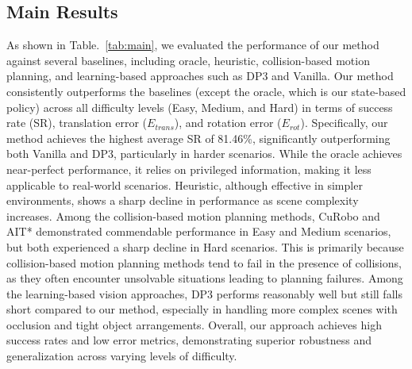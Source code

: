 \subsection{Main Results} 
As shown in Table.~\ref{tab:main}, we evaluated the performance of our method against several baselines, including oracle, heuristic, collision-based motion planning, and learning-based approaches such as DP3 and Vanilla. Our method consistently outperforms the baselines (except the oracle, which is our state-based policy) across all difficulty levels (Easy, Medium, and Hard) in terms of success rate (SR), translation error ($E_{trans}$), and rotation error ($E_{rot}$). Specifically, our method achieves the highest average SR of 81.46\%, significantly outperforming both Vanilla and DP3, particularly in harder scenarios. While the oracle achieves near-perfect performance, it relies on privileged information, making it less applicable to real-world scenarios. Heuristic, although effective in simpler environments, shows a sharp decline in performance as scene complexity increases. 
Among the collision-based motion planning methods, CuRobo and AIT* demonstrated commendable performance in Easy and Medium scenarios, but both experienced a sharp decline in Hard scenarios. This is primarily because collision-based motion planning methods tend to fail in the presence of collisions, as they often encounter unsolvable situations leading to planning failures. 
Among the learning-based vision approaches, DP3 performs reasonably well but still falls short compared to our method, especially in handling more complex scenes with occlusion and tight object arrangements. Overall, our approach achieves high success rates and low error metrics, demonstrating superior robustness and generalization across varying levels of difficulty. 

